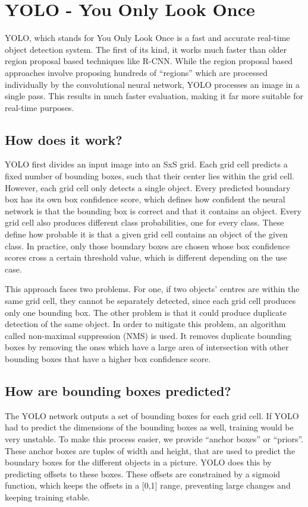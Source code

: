 \documentclass[12pt,letterpaper]{article}
\begin{document}
\section{YOLO - You Only Look Once}

YOLO, which stands for You Only Look Once is a fast and accurate real-time object detection system. The first of its kind, it works much faster than older region proposal based techniques like R-CNN. While the region proposal based approaches involve proposing hundreds of “regions” which are processed individually by the convolutional neural network, YOLO processes an image in a single pass. This results in much faster evaluation, making it far more suitable for real-time purposes.

\subsection{How does it work?}

YOLO first divides an input image into an SxS grid. Each grid cell predicts a fixed number of bounding boxes, such that their center lies within the grid cell. However, each grid cell only detects a single object. Every predicted boundary box has its own box confidence score, which defines how confident the neural network is that the bounding box is correct and that it contains an object. Every grid cell also produces different class probabilities, one for every class. These define how probable it is that a given grid cell contains an object of the given class. In practice, only those boundary boxes are chosen whose box confidence scores cross a certain threshold value, which is different depending on the use case.

    This approach faces two problems. For one, if two objects’ centres are within the same grid cell, they cannot be separately detected, since each grid cell produces only one bounding box. The other problem is that it could produce duplicate detection of the same object. In order to mitigate this problem, an algorithm called non-maximal suppression (NMS) is used. It removes duplicate bounding boxes by removing the ones which have a large area of intersection with other bounding boxes that have a higher box confidence score.

\subsection{How are bounding boxes predicted?}

The YOLO network outputs a set of bounding boxes for each grid cell. If YOLO had to predict the dimensions of the bounding boxes as well, training would be very unstable. To make this process easier, we provide “anchor boxes” or “priors”. These anchor boxes are tuples of width and height, that are used to predict the boundary boxes for the different objects in a picture. YOLO does this by predicting offsets to these boxes. These offsets are constrained by a sigmoid function, which keeps the offsets in a [0,1] range, preventing large changes and keeping training stable.
\end{document}
